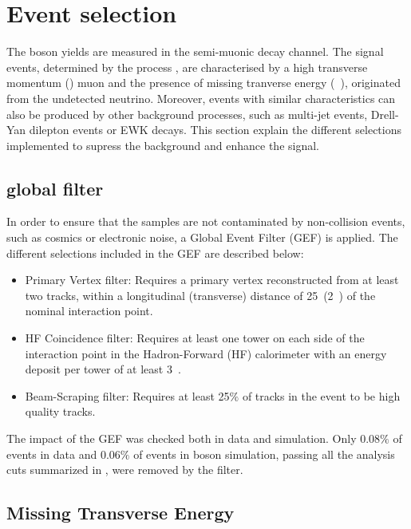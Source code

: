 \section{Event selection} \label{sec:WBoson_Selection}


The \W boson yields are measured in the semi-muonic decay channel. The signal events, determined by the process \WToMuNu, are characterised by a high transverse momentum (\pt) muon and the presence of missing tranverse energy (\ETslash\ ), originated from the undetected neutrino. Moreover, events with similar characteristics can also be produced by other background processes, such as multi-jet events, Drell-Yan dilepton events or EWK decays. This section explain the different selections implemented to supress the background and enhance the signal.

\subsection{\pPb global filter} \label{sec:WBoson_Selection_EventFilter}

In order to ensure that the samples are not contaminated by non-collision events, such as cosmics or electronic noise, a \pPb Global Event Filter (GEF) is applied. The different selections included in the \pPb GEF are described below:

\begin{itemize}
\item Primary Vertex filter: Requires a primary vertex reconstructed from at least two tracks, within a longitudinal (transverse) distance of 25~\cm (2~\cm) of the nominal interaction point.
\item HF Coincidence filter: Requires at least one tower on each side of the interaction point in the Hadron-Forward (HF) calorimeter with an energy deposit per tower of at least 3~\GeV.
\item Beam-Scraping filter: Requires at least 25$\%$ of tracks in the event to be high quality tracks.
\end{itemize}

The impact of the GEF was checked both in data and simulation. Only 0.08$\%$ of events in data and 0.06$\%$ of events in \W boson simulation, passing all the analysis cuts summarized in , were removed by the filter.


\subsection{Missing Transverse Energy} \label{sec:WBoson_Selection_MET}

